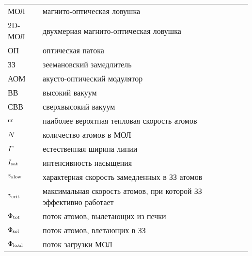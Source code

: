

 
\begin{tabular}{lll}
	МОЛ & магнито-оптическая ловушка & \pageref{subsec:мол} \\ 
	2D-МОЛ  & двухмерная магнито-оптическая ловушка & \\ 
	ОП  & оптическая патока & \\ 
	ЗЗ & зеемановский замедлитель & \\
	АОМ & акусто-оптический модулятор & \\
	ВВ & высокий вакуум & \\
	СВВ & сверхвысокий вакуум & \\
	$\alpha$ & наиболее вероятная тепловая скорость атомов & \pageref{Поток атомов на выходе}\\ 
	$N$ & количество атомов в МОЛ & \\
	$\Gamma$ & естественная ширина линии & \\
	$I_{\textnormal{sat}}$ & интенсивность насыщения & \\
	$v_{\textnormal{slow}}$ &  характерная скорость замедленных в ЗЗ атомов & \pageref{Тормозящая сила} \\
	$v_{\textnormal{crit}}$ & максимальная скорость атомов, при которой ЗЗ эффективно работает  & \pageref{Тормозящая сила} \\
	$\Phi_{\textnormal{tot}}$ & поток атомов, вылетающих из печки & \\
	$\Phi_{\textnormal{sol}}$ & поток атомов, влетающих в ЗЗ & \pageref{Поток атомов на выходе} \\
	$\Phi_{\textnormal{load}}$ & поток загрузки МОЛ & \pageref{Динамика количества атомов в МОЛ} \\
\end{tabular}


